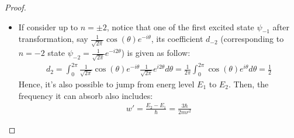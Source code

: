 \documentclass{article}
\begin{document}
\begin{proof}
\begin{itemize}
        \item[(e)] If consider up to $n=\pm 2$, notice that one of the first excited state $\psi_{-1}$ after transformation, say $\frac{1}{\sqrt{2\pi}}\cos(\theta)e^{-i\theta}$, its coefficient $d_{-2}$ (corresponding to $n=-2$ state $\psi_{-2}=\frac{1}{\sqrt{2\pi}}e^{-i2\theta}$) is given as follow:
        \begin{align}
            d_2 = \int_{0}^{2\pi}\frac{1}{\sqrt{2\pi}}\cos(\theta)e^{-i\theta}\frac{1}{\sqrt{2\pi}}e^{i2\theta}d\theta = \frac{1}{2\pi}\int_{0}^{2\pi}\cos(\theta)e^{i\theta}d\theta=\frac{1}{2}
        \end{align}
        Hence, it's also possible to jump from energ level $E_1$ to $E_2$. Then, the frequency it can absorb also includes:
        \begin{align}
            w' = \frac{E_2-E_1}{\hbar} = \frac{3\hbar}{2mr^2}
        \end{align}
    \end{itemize}
\end{proof}

\newpage
\end{document}
